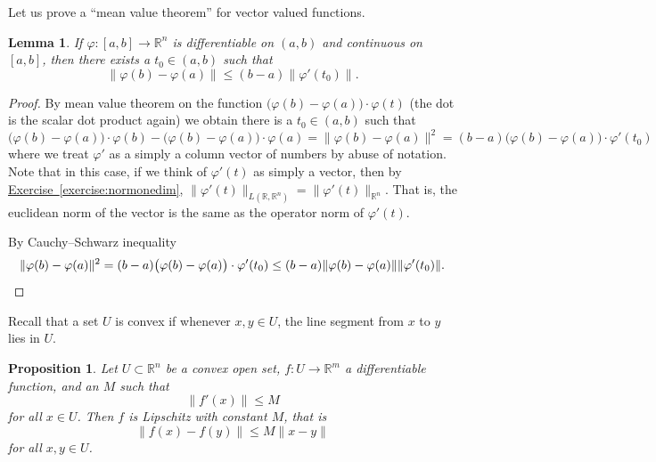 \documentclass[12pt]{book}
\newcommand{\snorm}[1]{\lVert {#1} \rVert}
\newcommand{\R}{{\mathbb{R}}}
\theoremstyle{plain}
\newtheorem{lemma}[thm]{Lemma}
\newtheorem{prop}[thm]{Proposition}
\theoremstyle{remark}
\theoremstyle{definition}
\theoremstyle{exercise}
\theoremstyle{example}
\newcommand{\exerciseref}[1]{\hyperref[#1]{Exercise~\ref*{#1}}}
\begin{document}
Let us prove a ``mean value theorem'' for vector valued functions.

\begin{lemma}
If $\varphi \colon [a,b] \to \R^n$ is differentiable on $(a,b)$ and
continuous on $[a,b]$, then there exists a $t_0 \in (a,b)$ such that
\begin{equation*}
\snorm{\varphi(b)-\varphi(a)} \leq (b-a) \snorm{\varphi'(t_0)} .
\end{equation*}
\end{lemma}

\begin{proof}
By mean value theorem on the function
$\bigl(\varphi(b)-\varphi(a) \bigr) \cdot \varphi(t)$
(the dot is the scalar dot product again) we obtain
there is a $t_0 \in (a,b)$ such that
\begin{equation*}
\bigl(\varphi(b)-\varphi(a) \bigr) \cdot \varphi(b) - 
\bigl(\varphi(b)-\varphi(a) \bigr) \cdot \varphi(a)  = 
\snorm{\varphi(b)-\varphi(a)}^2
=
(b-a)
\bigl(\varphi(b)-\varphi(a) \bigr) \cdot \varphi'(t_0)
\end{equation*}
where we treat $\varphi'$ as a simply a column vector of numbers by abuse of
notation.  Note that
in this case, if we think of $\varphi'(t)$ as simply a vector, then by
\exerciseref{exercise:normonedim},
$\snorm{\varphi'(t)}_{L(\R,\R^n)} = \snorm{\varphi'(t)}_{\R^n}$.
That is, the euclidean norm of the vector is the same as the operator norm
of $\varphi'(t)$.

By Cauchy--Schwarz inequality
\begin{equation*}
\snorm{\varphi(b)-\varphi(a)}^2
=
(b-a)\bigl(\varphi(b)-\varphi(a) \bigr) \cdot \varphi'(t_0)
\leq
(b-a)
\snorm{\varphi(b)-\varphi(a)} \snorm{\varphi'(t_0)} . \qedhere
\end{equation*}
\end{proof}

Recall that a set $U$ is convex
if whenever $x,y \in U$, the line segment from
$x$ to $y$ lies in $U$.

\begin{prop} \label{mv:prop:convexlip}
Let $U \subset \R^n$ be a convex open set, $f \colon U \to \R^m$
a differentiable function, and an $M$ such that
\begin{equation*}
\snorm{f'(x)} \leq M
\end{equation*}
for all $x \in U$.  Then $f$ is Lipschitz with constant $M$, that is
\begin{equation*}
\snorm{f(x)-f(y)} \leq M \snorm{x-y}
\end{equation*}
for all $x,y \in U$.
\end{prop}
\end{document}
